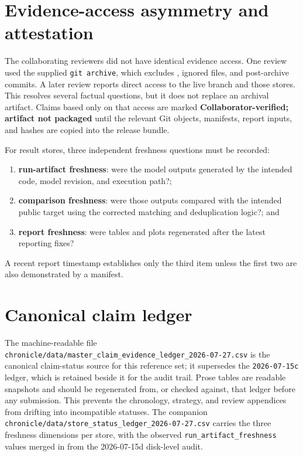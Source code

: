 \documentclass[11pt]{report}
\newcommand{\code}[1]{\texttt{#1}}
\newcommand{\file}[1]{\texttt{#1}}
\newcommand{\statusCollaboratorVerified}{\textbf{Collaborator-verified; artifact not packaged}}
\begin{document}
\section{Evidence-access asymmetry and attestation}

The collaborating reviewers did not have identical evidence access. One review used
the supplied \code{git archive}, which excludes , ignored files, and
post-archive commits. A later review reports direct access to the live branch and
those stores. This resolves several factual questions, but it does not replace an
archival artifact. Claims based only on that access are marked
\statusCollaboratorVerified{} until the relevant Git objects, manifests, report
inputs, and hashes are copied into the release bundle.

For result stores, three independent freshness questions must be recorded:
\begin{enumerate}[nosep]
  \item \textbf{run-artifact freshness}: were the model outputs generated by the
        intended code, model revision, and execution path?;
  \item \textbf{comparison freshness}: were those outputs compared with the intended
        public target using the corrected matching and deduplication logic?; and
  \item \textbf{report freshness}: were tables and plots regenerated after the latest
        reporting fixes?
\end{enumerate}
A recent report timestamp establishes only the third item unless the first two are
also demonstrated by a manifest.

\section{Canonical claim ledger}

The machine-readable file
\file{chronicle/data/master\_claim\_evidence\_ledger\_2026-07-27.csv} is the
canonical claim-status source for this reference set; it supersedes the
\code{2026-07-15c} ledger, which is retained beside it for the audit trail. Prose
tables are readable snapshots and should be regenerated from, or checked against,
that ledger before any submission. This prevents the chronology, strategy, and review
appendices from drifting into incompatible statuses. The companion
\file{chronicle/data/store\_status\_ledger\_2026-07-27.csv} carries the three
freshness dimensions per store, with the observed \code{run\_artifact\_freshness}
values merged in from the 2026-07-15d disk-level audit.
\end{document}
